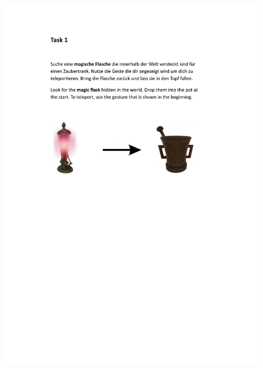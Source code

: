 \begin{figure}[!h]
\centering
\includegraphics[page=2,width=\textwidth]{figures/Appendix/task explaination.pdf}
\end{figure}


